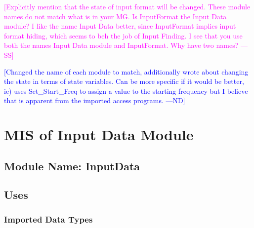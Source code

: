 \documentclass[12pt]{article}
\newcommand{\authornote}[3]{\textcolor{#1}{[#3 ---#2]}}
\newcommand{\authornote}[3]{}
\newcommand{\wss}[1]{\authornote{magenta}{SS}{#1}}
\newcommand{\nd}[1]{\authornote{blue}{ND}{#1}}
\begin{document}
\wss{Explicitly mention that the state of input format will be changed.  These
  module names do not match what is in your MG.  Is InputFormat the Input Data
  module?  I like the name Input Data better, since InputFormat implies input
  format hiding, which seems to beh the job of Input Finding.  I see that you
  use both the names Input Data module and InputFormat.  Why have two names?}
  
\nd{Changed the name of each module to match, additionally wrote about changing
the state in terms of state variables. Can be more specific if it would be 
better, ie) uses Set\_Start\_Freq to assign a value to the starting frequency
but I believe that is apparent from the imported access programs.}
  

\section{MIS of Input Data Module}
\subsection{Module Name: InputData}
\subsection{Uses}
\subsubsection{Imported Data Types}
\end{document}
